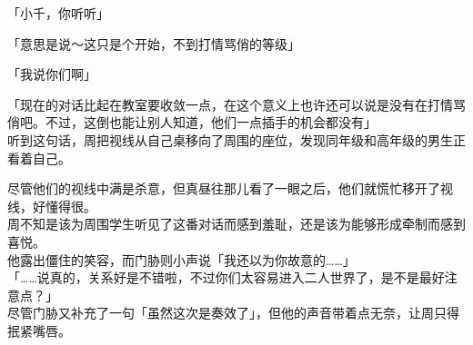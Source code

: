 「小千，你听听」

「意思是说～这只是个开始，不到打情骂俏的等级」

「我说你们啊」

「现在的对话比起在教室要收敛一点，在这个意义上也许还可以说是没有在打情骂俏吧。不过，这倒也能让别人知道，他们一点插手的机会都没有」\\

听到这句话，周把视线从自己桌移向了周围的座位，发现同年级和高年级的男生正看着自己。

尽管他们的视线中满是杀意，但真昼往那儿看了一眼之后，他们就慌忙移开了视线，好懂得很。\\

周不知是该为周围学生听见了这番对话而感到羞耻，还是该为能够形成牵制而感到喜悦。\\

他露出僵住的笑容，而门胁则小声说「我还以为你故意的……」\\

「……说真的，关系好是不错啦，不过你们太容易进入二人世界了，是不是最好注意点？」\\

尽管门胁又补充了一句「虽然这次是奏效了」，但他的声音带着点无奈，让周只得抿紧嘴唇。

